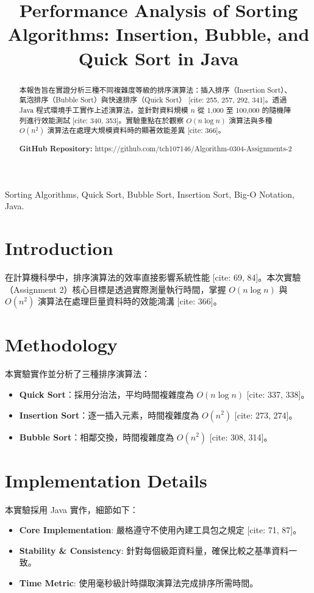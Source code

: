 \documentclass[conference, a4paper]{IEEEtran}
\title{Performance Analysis of Sorting Algorithms: Insertion, Bubble, and Quick Sort in Java}
\author{\IEEEauthorblockN{蔡晟旭 (Student ID: 1113405013)}
\IEEEauthorblockA{國立澎湖科技大學 資訊工程學系 \\
National Penghu University of Science and Technology}}
\begin{document}
\maketitle

\begin{abstract}
本報告旨在實證分析三種不同複雜度等級的排序演算法：插入排序（Insertion Sort）、氣泡排序（Bubble Sort）與快速排序（Quick Sort） [cite: 255, 257, 292, 341]。透過 Java 程式環境手工實作上述演算法，並針對資料規模 $n$ 從 1,000 至 100,000 的隨機陣列進行效能測試 [cite: 340, 353]。實驗重點在於觀察 $O(n \log n)$ 演算法與多種 $O(n^2)$ 演算法在處理大規模資料時的顯著效能差異 [cite: 366]。

\vspace{0.2cm}
\textbf{GitHub Repository:} https://github.com/tch107146/Algorithm-0304-Assignments-2
\end{abstract}

\begin{IEEEkeywords}
Sorting Algorithms, Quick Sort, Bubble Sort, Insertion Sort, Big-O Notation, Java.
\end{IEEEkeywords}

\section{Introduction}
在計算機科學中，排序演算法的效率直接影響系統性能 [cite: 69, 84]。本次實驗（Assignment 2）核心目標是透過實際測量執行時間，掌握 $O(n \log n)$ 與 $O(n^2)$ 演算法在處理巨量資料時的效能鴻溝 [cite: 366]。

\section{Methodology}
本實驗實作並分析了三種排序演算法：
\begin{itemize}
    \item \textbf{Quick Sort}：採用分治法，平均時間複雜度為 $O(n \log n)$ [cite: 337, 338]。
    \item \textbf{Insertion Sort}：逐一插入元素，時間複雜度為 $O(n^2)$ [cite: 273, 274]。
    \item \textbf{Bubble Sort}：相鄰交換，時間複雜度為 $O(n^2)$ [cite: 308, 314]。
\end{itemize}

\section{Implementation Details}
本實驗採用 Java 實作，細節如下：
\begin{itemize}
    \item \textbf{Core Implementation}: 嚴格遵守不使用內建工具包之規定 [cite: 71, 87]。
    \item \textbf{Stability \& Consistency}: 針對每個級距資料量，確保比較之基準資料一致。
    \item \textbf{Time Metric}: 使用毫秒級計時擷取演算法完成排序所需時間。
\end{itemize}
\end{document}
